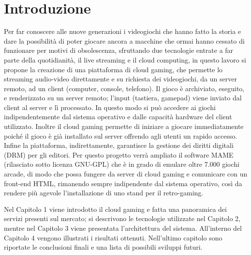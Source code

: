 %
%

\chapter*{Introduzione}
Per far conoscere alle nuove generazioni i videogiochi che hanno fatto la storia e dare la possibilità di poter giocare ancora a macchine che ormai hanno cessato di funzionare per motivi di obsolescenza, sfruttando due tecnologie entrate a far parte della quotidianità, il live streaming e il cloud computing, in questo lavoro si propone la creazione di una piattaforma di cloud gaming, che permette lo streaming audio-video direttamente e su richiesta dei videogiochi, da un server remoto, ad un client (computer, console, telefono). Il gioco è archiviato, eseguito, e renderizzato su un server remoto; l'input (tastiera, gamepad) viene inviato dal client al server e lì processato. In questo modo si può accedere ai giochi indipendentemente dal sistema operativo e dalle capacità hardware del client utilizzato. Inoltre il cloud gaming permette di iniziare a giocare immediatamente poiché il gioco è già installato sul server offrendo agli utenti un rapido accesso. Infine la piattaforma, indirettamente, garantisce la gestione dei diritti digitali (DRM) per gli editori. Per questo progetto verrà ampliato il software MAME (rilasciato sotto licenza GNU-GPL) che è in grado di emulare oltre 7.000 giochi arcade, di modo che possa fungere da server di cloud gaming e comunicare con un front-end HTML, rimanendo sempre indipendente dal sistema operativo, così da rendere più agevole l’installazione di uno stand per il retro-gaming.

Nel Capitolo 1 viene introdotto il cloud gaming e fatta una panoramica dei servizi presenti sul mercato; si descrivono le tecnologie utilizzate nel Capitolo 2, mentre nel Capitolo 3 viene presentata l'architettura del sistema. All’interno del Capitolo 4 vengono illustrati i risultati ottenuti. Nell'ultimo capitolo sono riportate le conclusioni finali e una lista di possibili sviluppi futuri.